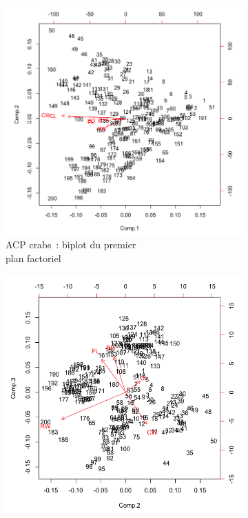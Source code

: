 \documentclass[a4paper,11pt]{report}
\begin{document}
\begin{figure}[H]
	\centering
	\captionsetup{justification=centering, margin=2cm}
	\begin{subfigure}[b]{0.5\linewidth}
		\centering
		\captionsetup{justification=centering, margin=1cm}
		\includegraphics[width=1\columnwidth]{img/2-3-1-biplot-acp-crabs-plan-1-2}
		\caption{\scriptsize ACP crabs~: biplot du premier \\plan factoriel}
		\label{fig:biplot_acp_crabs_plan_1_2}
	\end{subfigure}%
	\begin{subfigure}[b]{0.5\linewidth}
		\centering
		\captionsetup{justification=centering, margin=1cm}
		\includegraphics[width=1\columnwidth]{img/2-3-1-biplot-acp-crabs-plan-2-3}

\end{subfigure}
\end{figure}
\end{document}
